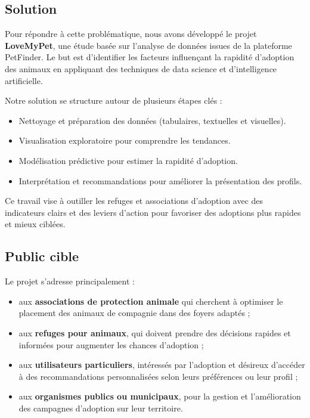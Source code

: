 \documentclass[a4paper,12pt]{article}
\begin{document}
\subsection {Solution}

Pour répondre à cette problématique, nous avons développé le projet \textbf{LoveMyPet}, une étude basée sur l’analyse de données issues de la plateforme PetFinder. Le but est d’identifier les facteurs influençant la rapidité d’adoption des animaux en appliquant des techniques de data science et d’intelligence artificielle.

Notre solution se structure autour de plusieurs étapes clés :
\begin{itemize}
    \item Nettoyage et préparation des données (tabulaires, textuelles et visuelles).
    \item Visualisation exploratoire pour comprendre les tendances.
    \item Modélisation prédictive pour estimer la rapidité d’adoption.
    \item Interprétation et recommandations pour améliorer la présentation des profils.
\end{itemize}

Ce travail vise à outiller les refuges et associations d’adoption avec des indicateurs clairs et des leviers d’action pour favoriser des adoptions plus rapides et mieux ciblées.

\subsection{Public cible}

Le projet s’adresse principalement :
\begin{itemize}
    \item aux \textbf{associations de protection animale} qui cherchent à optimiser le placement des animaux de compagnie dans des foyers adaptés ;
    \item aux \textbf{refuges pour animaux}, qui doivent prendre des décisions rapides et informées pour augmenter les chances d’adoption ;
    \item aux \textbf{utilisateurs particuliers}, intéressés par l’adoption et désireux d’accéder à des recommandations personnalisées selon leurs préférences ou leur profil ;
    \item aux \textbf{organismes publics ou municipaux}, pour la gestion et l'amélioration des campagnes d'adoption sur leur territoire.
\end{itemize}
\end{document}
